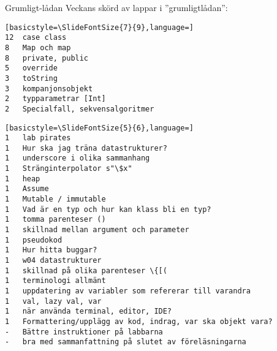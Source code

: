 

\ifkompendium\else

\begin{Slide}{Grumligt-lådan}
Veckans skörd av lappar i ''grumligtlådan'':
\begin{multicols}{2}
\begin{lstlisting}[basicstyle=\SlideFontSize{7}{9},language=]
12	case class
8	Map och map
8	private, public
5	override
3	toString
3	kompanjonsobjekt
2	typparametrar [Int]
2	Specialfall, sekvensalgoritmer
\end{lstlisting}

\columnbreak

\begin{lstlisting}[basicstyle=\SlideFontSize{5}{6},language=]
1	lab pirates
1	Hur ska jag träna datastrukturer?
1	underscore i olika sammanhang
1	Stränginterpolator s"\$x" 
1	heap
1	Assume
1	Mutable / immutable
1	Vad är en typ och hur kan klass bli en typ?
1	tomma parenteser ()
1	skillnad mellan argument och parameter
1	pseudokod
1	Hur hitta buggar?
1	w04 datastrukturer
1	skillnad på olika parenteser \{[(
1	terminologi allmänt
1	uppdatering av variabler som refererar till varandra
1	val, lazy val, var
1	när använda terminal, editor, IDE?
1	Formattering/upplägg av kod, indrag, var ska objekt vara?
-	Bättre instruktioner på labbarna
-	bra med sammanfattning på slutet av föreläsningarna
\end{lstlisting}
\end{multicols}
\end{Slide}

\fi

